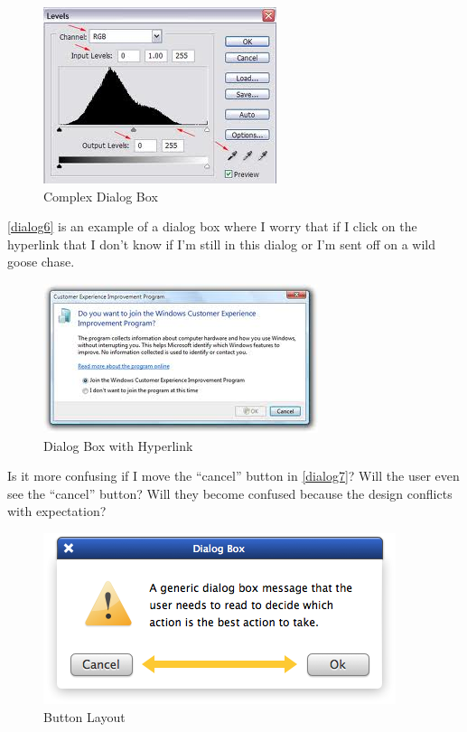 \begin{figure}
\centerline{
\includegraphics[scale=.5]{chapter8.tex/dialog5}
}
\caption{Complex Dialog Box}
\label{dialog5}
\end{figure}


 \autoref{dialog6}  is an example of a dialog box where I worry that if I click on the hyperlink that I don't know if I'm still in this dialog or I'm sent off on a wild goose chase.


\begin{figure}
\centerline{
\includegraphics[scale=.5]{chapter8.tex/dialog6}
}
\caption{Dialog Box with Hyperlink}
\label{dialog6}
\end{figure}


Is it more confusing if I move the ``cancel'' button in  \autoref{dialog7}?  Will the user even see the ``cancel'' button? Will they become confused because the design conflicts with expectation?


\begin{figure}
\centerline{
\includegraphics[scale=.5]{chapter8.tex/dialog7}
}
\caption{Button Layout}
\label{dialog7}
\end{figure}


